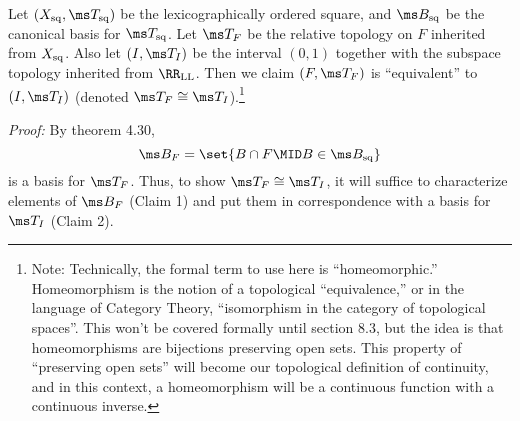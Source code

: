 \documentclass{fkpset}
\newcommand{\sq}{{\rm sq}}
\newcommand{\RRLL}{\ensuremath \RR_{\rm LL}}
\begin{document}
  \begin{solution}
    Let $(X_\sq, \ms T_\sq)$ be the lexicographically ordered square,
    and $\ms B_\sq$ be the canonical basis for $\ms T_\sq$. Let $\ms
    T_F$ be the relative topology on $F$ inherited from $X_\sq$. Also
    let $(I, \ms T_I)$ be the interval $(0,1)$ together with the
    subspace topology inherited from $\RRLL$. Then we claim $(F, \ms
    T_F)$ is ``equivalent'' to $(I, \ms T_I)$ (denoted $\ms T_F \cong
    \ms T_I$).\footnote{Note: Technically, the formal term to use here
      is ``homeomorphic.'' Homeomorphism is the notion of a
      topological ``equivalence,'' or in the language of Category
      Theory, ``isomorphism in the category of topological spaces''.
      This won't be covered formally until section 8.3, but the idea
      is that homeomorphisms are bijections preserving open sets. This
      property of ``preserving open sets'' will become our topological
      definition of continuity, and in this context, a homeomorphism
      will be a continuous function with a continuous inverse.}

    \emph{Proof:}
    By theorem 4.30,
    \[
      \ms B_F = \set{B \cap F \MID B \in \ms B_\sq}
    \]
    is a basis for $\ms T_F$. Thus, to show $\ms T_F \cong \ms T_I$,
    it will suffice to characterize elements of $\ms B_F$ (Claim 1)
    and put them in correspondence with a basis for $\ms T_I$ (Claim
    2).


\end{solution}
\end{document}
